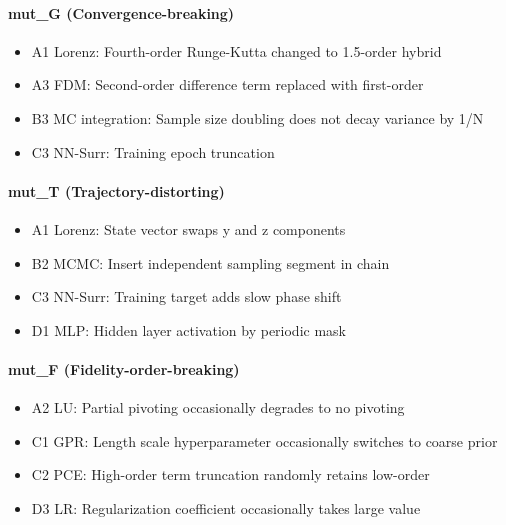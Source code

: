 \documentclass[review,12pt,authoryear]{elsarticle}
\providecommand{\tightlist}{\setlength{\itemsep}{0pt}\setlength{\parskip}{0pt}}
\begin{document}
\paragraph{mut\_G
(Convergence-breaking)}\label{mut_g-convergence-breaking}

\begin{itemize}
\tightlist
\item
  A1 Lorenz: Fourth-order Runge-Kutta changed to 1.5-order hybrid
\item
  A3 FDM: Second-order difference term replaced with first-order
\item
  B3 MC integration: Sample size doubling does not decay variance by 1/N
\item
  C3 NN-Surr: Training epoch truncation
\end{itemize}

\paragraph{mut\_T
(Trajectory-distorting)}\label{mut_t-trajectory-distorting}

\begin{itemize}
\tightlist
\item
  A1 Lorenz: State vector swaps y and z components
\item
  B2 MCMC: Insert independent sampling segment in chain
\item
  C3 NN-Surr: Training target adds slow phase shift
\item
  D1 MLP: Hidden layer activation by periodic mask
\end{itemize}

\paragraph{mut\_F
(Fidelity-order-breaking)}\label{mut_f-fidelity-order-breaking}

\begin{itemize}
\tightlist
\item
  A2 LU: Partial pivoting occasionally degrades to no pivoting
\item
  C1 GPR: Length scale hyperparameter occasionally switches to coarse
  prior
\item
  C2 PCE: High-order term truncation randomly retains low-order
\item
  D3 LR: Regularization coefficient occasionally takes large value
\end{itemize}
\end{document}
